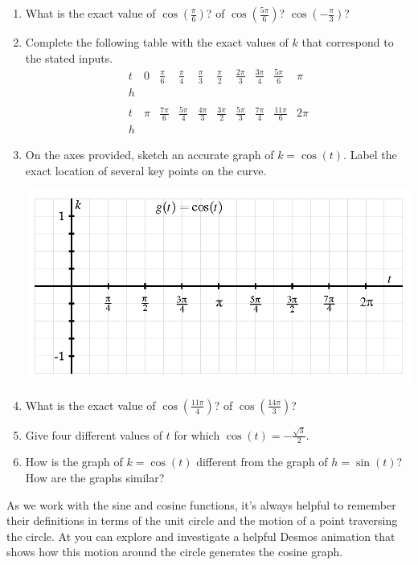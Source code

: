 \documentclass[nooutcomes]{ximera}
\begin{document}
\begin{exploration}
\begin{enumerate}[label=\alph*.]
\item What is the exact value of \(\cos(\frac{\pi}{6})\)?  of \(\cos(\frac{5\pi}{6})\)? \(\cos(-\frac{\pi}{3})\)?
\item Complete the following table with the exact values of \(k\) that correspond to the stated inputs.
\[
\begin{array}{llllllllll}
t&0&\frac{\pi}{6}&\frac{\pi}{4}&\frac{\pi}{3}&\frac{\pi}{2}&\frac{2\pi}{3}&\frac{3\pi}{4}&\frac{5\pi}{6}&\pi\\
\hline
h&&&&&&&&&\\
&&&&&&&&&\\
t&\pi&\frac{7\pi}{6}&\frac{5\pi}{4}&\frac{4\pi}{3}&\frac{3\pi}{2}&\frac{5\pi}{3}&\frac{7\pi}{4}&\frac{11\pi}{6}&2\pi\\
\hline
h&&&&&&&&&
\end{array}
\]
\item On the axes provided, sketch an accurate graph of \(k = \cos(t)\).  Label the exact location of several key points on the curve.
\begin{image}
\includegraphics{sine-cosine-definition-axes.png}
\end{image}
\item What is the exact value of \(\cos( \frac{11\pi}{4} )\)? of \(\cos( \frac{14\pi}{3} )\)?
\item Give four different values of \(t\) for which \(\cos(t) = -\frac{\sqrt{3}}{2}\).
\item How is the graph of \(k = \cos(t)\) different from the graph of \(h = \sin(t)\)?  How are the graphs similar?
\end{enumerate}

\end{exploration}

As we work with the sine and cosine functions, it's always helpful to remember their definitions in terms of the unit circle and the motion of a point traversing the circle.  At  you can explore and investigate a helpful Desmos animation that shows how this motion around the circle generates the cosine graph.
\end{document}
